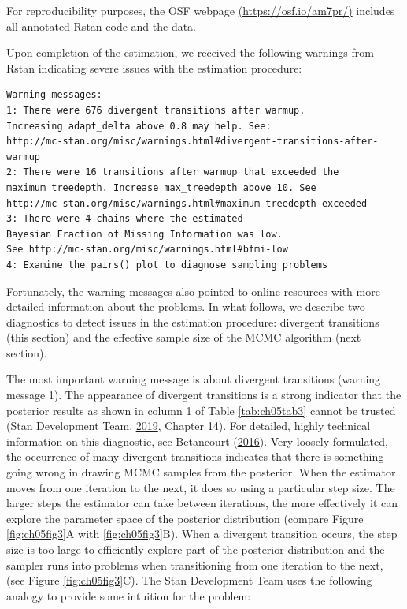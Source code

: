 \documentclass[openright,titlepage,12pt,a4paper]{book}
\begin{document}
For reproducibility purposes, the OSF webpage \href{https://osf.io/am7pr/}{(https://osf.io/am7pr/)} includes all annotated Rstan code and the data.

Upon completion of the estimation, we received the following warnings from Rstan indicating severe issues with the estimation procedure:

\begin{verbatim}
Warning messages:
1: There were 676 divergent transitions after warmup. 
Increasing adapt_delta above 0.8 may help. See:
http://mc-stan.org/misc/warnings.html#divergent-transitions-after-warmup 
2: There were 16 transitions after warmup that exceeded the 
maximum treedepth. Increase max_treedepth above 10. See
http://mc-stan.org/misc/warnings.html#maximum-treedepth-exceeded 
3: There were 4 chains where the estimated 
Bayesian Fraction of Missing Information was low. 
See http://mc-stan.org/misc/warnings.html#bfmi-low 
4: Examine the pairs() plot to diagnose sampling problems
\end{verbatim}

Fortunately, the warning messages also pointed to online resources with more detailed information about the problems. In what follows, we describe two diagnostics to detect issues in the estimation procedure: divergent transitions (this section) and the effective sample size of the MCMC algorithm (next section).

The most important warning message is about divergent transitions (warning message 1). The appearance of divergent transitions is a strong indicator that the posterior results as shown in column 1 of Table \ref{tab:ch05tab3} cannot be trusted (Stan Development Team, \protect\hyperlink{ref-stan_development_team_stan_2019}{2019}, Chapter 14). For detailed, highly technical information on this diagnostic, see Betancourt (\protect\hyperlink{ref-betancourt_diagnosing_2016}{2016}). Very loosely formulated, the occurrence of many divergent transitions indicates that there is something going wrong in drawing MCMC samples from the posterior. When the estimator moves from one iteration to the next, it does so using a particular step size. The larger steps the estimator can take between iterations, the more effectively it can explore the parameter space of the posterior distribution (compare Figure \ref{fig:ch05fig3}A with \ref{fig:ch05fig3}B). When a divergent transition occurs, the step size is too large to efficiently explore part of the posterior distribution and the sampler runs into problems when transitioning from one iteration to the next, (see Figure \ref{fig:ch05fig3}C). The Stan Development Team uses the following analogy to provide some intuition for the problem:
\end{document}
